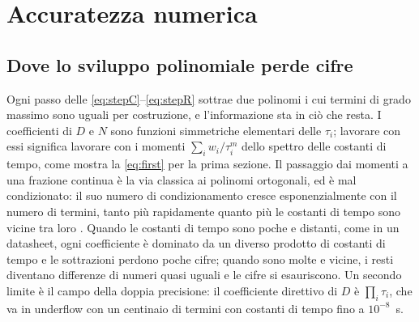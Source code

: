 \documentclass[10pt,a4paper]{scrartcl}
\begin{document}
\section{Accuratezza numerica}
\label{sec:numerics}

\subsection{Dove lo sviluppo polinomiale perde cifre}
Ogni passo delle \eqref{eq:stepC}--\eqref{eq:stepR} sottrae due polinomi i cui termini di grado massimo sono uguali per costruzione, e l'informazione sta in ciò che resta. I coefficienti di $D$ e $N$ sono funzioni simmetriche elementari delle $\tau_i$; lavorare con essi significa lavorare con i momenti $\sum_i w_i/\tau_i^m$ dello spettro delle costanti di tempo, come mostra la \eqref{eq:first} per la prima sezione. Il passaggio dai momenti a una frazione continua è la via classica ai polinomi ortogonali, ed è mal condizionato: il suo numero di condizionamento cresce esponenzialmente con il numero di termini, tanto più rapidamente quanto più le costanti di tempo sono vicine tra loro \cite{gautschi2004}. Quando le costanti di tempo sono poche e distanti, come in un datasheet, ogni coefficiente è dominato da un diverso prodotto di costanti di tempo e le sottrazioni perdono poche cifre; quando sono molte e vicine, i resti diventano differenze di numeri quasi uguali e le cifre si esauriscono. Un secondo limite è il campo della doppia precisione: il coefficiente direttivo di $D$ è $\prod_i\tau_i$, che va in underflow con un centinaio di termini con costanti di tempo fino a $10^{-8}$~s.
\end{document}
